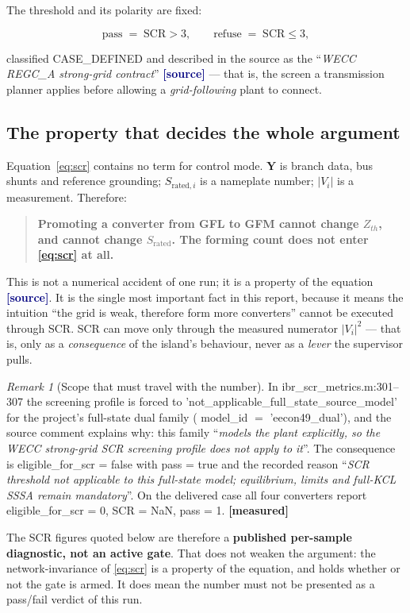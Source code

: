 \documentclass[12pt,a4paper]{article}
\theoremstyle{remark}
\newtheorem{remark}{Remark}
\newcommand{\code}[1]{{\ttfamily\small\hyphenchar\font=-1 #1}}
\newcommand{\measured}{\textcolor{ok}{\textbf{[measured]}}}
\newcommand{\sourcecode}{\textcolor{navy}{\textbf{[source]}}}
\begin{document}
The threshold and its polarity are fixed:

\begin{equation}
\text{pass} \;=\; \mathrm{SCR} > 3,
\qquad
\text{refuse} \;=\; \mathrm{SCR} \le 3,
\label{eq:threshold}
\end{equation}

classified \code{CASE\_DEFINED} and described in the source as the
``\emph{WECC REGC\_A strong-grid contract}'' \sourcecode{} --- that is, the
screen a transmission planner applies before allowing a \emph{grid-following}
plant to connect.

\subsection{The property that decides the whole argument}

Equation~\eqref{eq:scr} contains no term for control mode. $\mathbf{Y}$ is
branch data, bus shunts and reference grounding; $S_{\mathrm{rated},i}$ is a
nameplate number; $|V_i|$ is a measurement. Therefore:

\begin{quote}
\textbf{Promoting a converter from GFL to GFM cannot change $Z_{th}$, and cannot
change $S_{\mathrm{rated}}$. The forming count does not enter
\eqref{eq:scr} at all.}
\end{quote}

This is not a numerical accident of one run; it is a property of the equation
\sourcecode. It is the single most important fact in this report, because it
means the intuition ``the grid is weak, therefore form more converters'' cannot
be executed through SCR. SCR can move only through the measured numerator
$|V_i|^2$ --- that is, only as a \emph{consequence} of the island's behaviour,
never as a \emph{lever} the supervisor pulls.

\begin{remark}[Scope that must travel with the number]
In \code{ibr\_scr\_metrics.m:301--307} the screening profile is forced to
\code{'not\_applicable\_full\_state\_source\_model'} for the project's
full-state dual family (\code{model\_id} $=$ \code{'eecon49\_dual'}), and the
source comment explains why: this family ``\emph{models the plant explicitly, so
the WECC strong-grid SCR screening profile does not apply to it}''. The
consequence is \code{eligible\_for\_scr = false} with \code{pass = true} and the
recorded reason ``\emph{SCR threshold not applicable to this full-state model;
equilibrium, limits and full-KCL SSSA remain mandatory}''. On the delivered case
all four converters report \code{eligible\_for\_scr = 0}, \code{SCR = NaN},
\code{pass = 1}. \measured

The SCR figures quoted below are therefore a \textbf{published per-sample
diagnostic, not an active gate}. That does not weaken the argument: the
network-invariance of \eqref{eq:scr} is a property of the equation, and holds
whether or not the gate is armed. It does mean the number must not be presented
as a pass/fail verdict of this run.
\end{remark}
\end{document}
